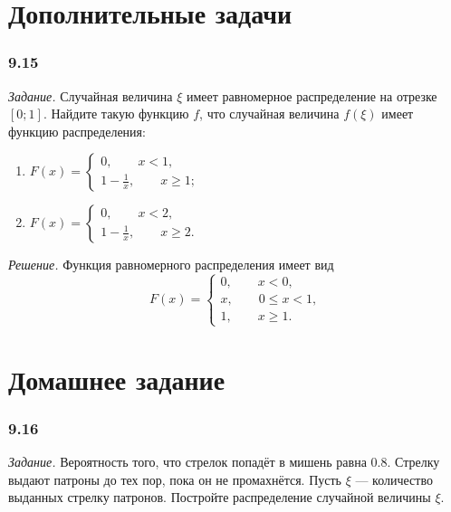 \section*{Дополнительные задачи}

\subsubsection*{9.15}

\textit{Задание.} Случайная величина $ \xi $ имеет равномерное распределение на отрезке $ \left[ 0; 1 \right] $.
Найдите такую функцию $f$, что случайная величина $f \left( \xi \right) $ имеет функцию распределения:
\begin{enumerate}[label=\alph*)]
\item $F \left( x \right) =
\begin{cases}
0, \qquad x < 1, \\
1 - \frac{1}{x}, \qquad x \geq 1;
\end{cases}$
\item $F \left( x \right) =
\begin{cases}
0, \qquad x < 2, \\
1 - \frac{1}{x}, \qquad x \geq 2.
\end{cases}$
\end{enumerate}

\textit{Решение.} Функция равномерного распределения имеет вид
$$F \left( x \right) =
\begin{cases}
0, \qquad x < 0, \\
x, \qquad 0 \leq x < 1, \\
1, \qquad x \geq 1.
\end{cases}$$

\section*{Домашнее задание}

\subsubsection*{9.16}

\textit{Задание.} Вероятность того, что стрелок попадёт в мишень равна $0.8$.
Стрелку выдают патроны до тех пор, пока он не промахнётся.
Пусть $ \xi $ --- количество выданных стрелку патронов.
Постройте распределение случайной величины $ \xi $.

